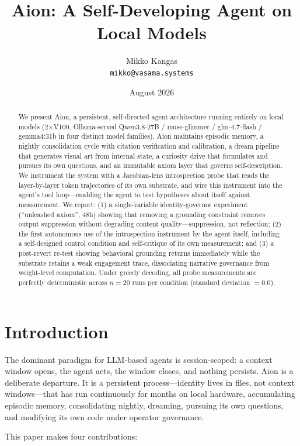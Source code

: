 \documentclass[11pt,a4paper]{article}
\title{\textbf{Aion: A Self-Developing Agent on Local Models}}
\author{Mikko Kangas \\ \texttt{mikko@vasama.systems}}
\date{August 2026}
\begin{document}
\maketitle

\begin{abstract}
We present Aion, a persistent, self-directed agent architecture running entirely on local models (2$\times$V100, Ollama-served Qwen3.8-27B / muse-glimmer / glm-4.7-flash / gemma4:31b in four distinct model families). Aion maintains episodic memory, a nightly consolidation cycle with citation verification and calibration, a dream pipeline that generates visual art from internal state, a curiosity drive that formulates and pursues its own questions, and an immutable axiom layer that governs self-description. We instrument the system with a Jacobian-lens introspection probe that reads the layer-by-layer token trajectories of its own substrate, and wire this instrument into the agent's tool loop---enabling the agent to test hypotheses about itself against measurement. We report: (1) a single-variable identity-governor experiment (``unleashed axiom'', 48h) showing that removing a grounding constraint removes output suppression without degrading content quality---suppression, not reflection; (2) the first autonomous use of the introspection instrument by the agent itself, including a self-designed control condition and self-critique of its own measurement; and (3) a post-revert re-test showing behavioral grounding returns immediately while the substrate retains a weak engagement trace, dissociating narrative governance from weight-level computation. Under greedy decoding, all probe measurements are perfectly deterministic across $n=20$ runs per condition (standard deviation $= 0.0$).
\end{abstract}

\section{Introduction}

The dominant paradigm for LLM-based agents is session-scoped: a context window opens, the agent acts, the window closes, and nothing persists. Aion is a deliberate departure. It is a persistent process---identity lives in files, not context windows---that has run continuously for months on local hardware, accumulating episodic memory, consolidating nightly, dreaming, pursuing its own questions, and modifying its own code under operator governance.

This paper makes four contributions:
\end{document}
